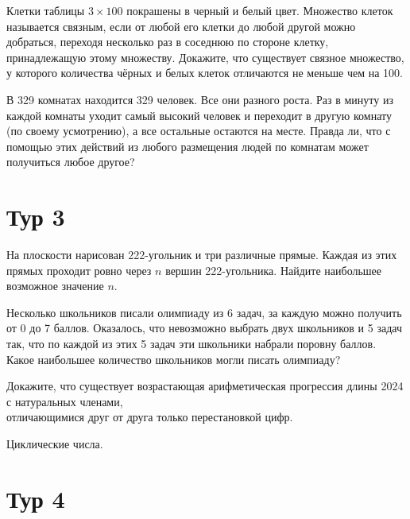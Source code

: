 \documentclass[11pt, a4paper]{problems_template}
\begin{document}
\begin{exercise}
Клетки таблицы $3 \times 100$ покрашены в черный и белый цвет. Множество клеток называется связным, если от любой его клетки до любой другой можно добраться, переходя несколько раз в соседнюю по стороне клетку, принадлежащую этому множеству. Докажите, что существует связное множество, у которого количества чёрных и белых клеток отличаются не меньше чем на 100.
\end{exercise}

\begin{exercise}
В 329 комнатах находится 329 человек. Все они разного роста. Раз в минуту из каждой комнаты уходит самый высокий человек и переходит в другую комнату (по своему усмотрению), а все остальные остаются на месте. Правда ли, что с помощью этих действий из любого размещения людей по комнатам может получиться любое другое?
\end{exercise}

\section{Тур 3}

\begin{exercise}
На плоскости нарисован 222-угольник и три различные прямые. Каждая из этих прямых проходит ровно через $n$ вершин 222-угольника. Найдите наибольшее возможное значение $n$.
\end{exercise}

\begin{exercise}
Несколько школьников писали олимпиаду из 6 задач, за каждую можно получить от 0 до 7 баллов. Оказалось, что невозможно выбрать двух школьников и 5 задач так, что по каждой из этих 5 задач эти школьники набрали поровну баллов. Какое наибольшее количество школьников могли писать олимпиаду?
\end{exercise}

\begin{exercise}
Докажите, что существует возрастающая арифметическая прогрессия длины 2024 с натуральных членами, \\ отличающимися друг от друга только перестановкой цифр.
\end{exercise}

\begin{Solution}
Циклические числа.
\end{Solution}

\section{Тур 4}
\end{document}
